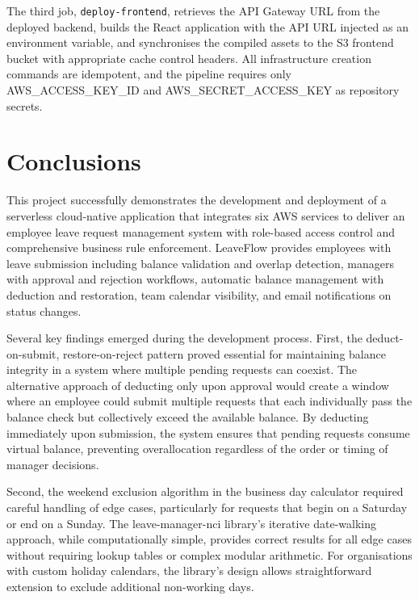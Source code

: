 \documentclass[conference]{IEEEtran}
\begin{document}
The third job, \texttt{deploy-frontend}, retrieves the API Gateway URL from the deployed backend, builds the React application with the API URL injected as an environment variable, and synchronises the compiled assets to the S3 frontend bucket with appropriate cache control headers. All infrastructure creation commands are idempotent, and the pipeline requires only AWS\_ACCESS\_KEY\_ID and AWS\_SECRET\_ACCESS\_KEY as repository secrets.

\section{Conclusions}

This project successfully demonstrates the development and deployment of a serverless cloud-native application that integrates six AWS services to deliver an employee leave request management system with role-based access control and comprehensive business rule enforcement. LeaveFlow provides employees with leave submission including balance validation and overlap detection, managers with approval and rejection workflows, automatic balance management with deduction and restoration, team calendar visibility, and email notifications on status changes.

Several key findings emerged during the development process. First, the deduct-on-submit, restore-on-reject pattern proved essential for maintaining balance integrity in a system where multiple pending requests can coexist. The alternative approach of deducting only upon approval would create a window where an employee could submit multiple requests that each individually pass the balance check but collectively exceed the available balance. By deducting immediately upon submission, the system ensures that pending requests consume virtual balance, preventing overallocation regardless of the order or timing of manager decisions.

Second, the weekend exclusion algorithm in the business day calculator required careful handling of edge cases, particularly for requests that begin on a Saturday or end on a Sunday. The leave-manager-nci library's iterative date-walking approach, while computationally simple, provides correct results for all edge cases without requiring lookup tables or complex modular arithmetic. For organisations with custom holiday calendars, the library's design allows straightforward extension to exclude additional non-working days.
\end{document}
